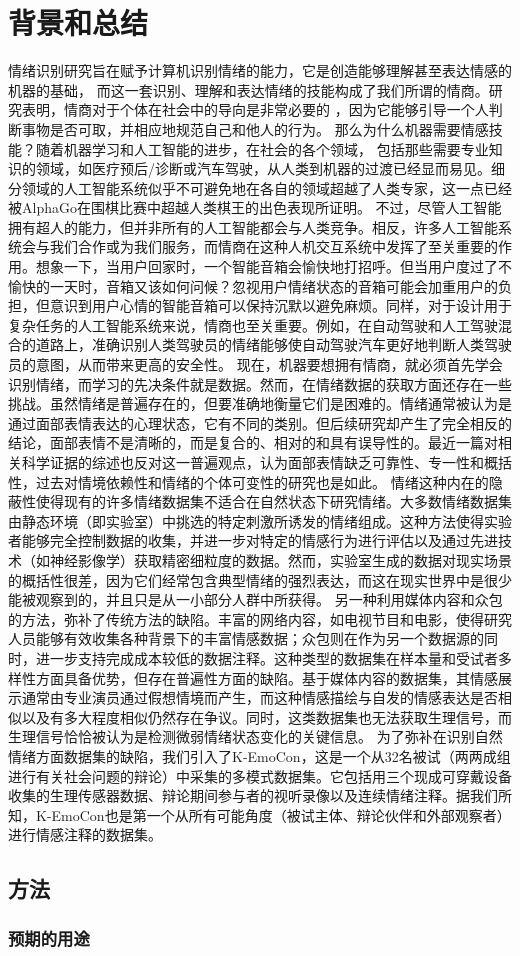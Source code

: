 \section{背景和总结}
情绪识别研究旨在赋予计算机识别情绪的能力，它是创造能够理解甚至表达情感的机器的基础，
而这一套识别、理解和表达情绪的技能构成了我们所谓的情商。研究表明，情商对于个体在社会中的导向是非常必要的
，因为它能够引导一个人判断事物是否可取，并相应地规范自己和他人的行为。
那么为什么机器需要情感技能？随着机器学习和人工智能的进步，在社会的各个领域，
包括那些需要专业知识的领域，如医疗预后/诊断或汽车驾驶，从人类到机器的过渡已经显而易见。细分领域的人工智能系统似乎不可避免地在各自的领域超越了人类专家，这一点已经被AlphaGo在围棋比赛中超越人类棋王的出色表现所证明。
不过，尽管人工智能拥有超人的能力，但并非所有的人工智能都会与人类竞争。相反，许多人工智能系统会与我们合作或为我们服务，而情商在这种人机交互系统中发挥了至关重要的作用。想象一下，当用户回家时，一个智能音箱会愉快地打招呼。但当用户度过了不愉快的一天时，音箱又该如何问候？忽视用户情绪状态的音箱可能会加重用户的负担，但意识到用户心情的智能音箱可以保持沉默以避免麻烦。同样，对于设计用于复杂任务的人工智能系统来说，情商也至关重要。例如，在自动驾驶和人工驾驶混合的道路上，准确识别人类驾驶员的情绪能够使自动驾驶汽车更好地判断人类驾驶员的意图，从而带来更高的安全性。
现在，机器要想拥有情商，就必须首先学会识别情绪，而学习的先决条件就是数据。然而，在情绪数据的获取方面还存在一些挑战。虽然情绪是普遍存在的，但要准确地衡量它们是困难的。情绪通常被认为是通过面部表情表达的心理状态，它有不同的类别。但后续研究却产生了完全相反的结论，面部表情不是清晰的，而是复合的、相对的和具有误导性的。最近一篇对相关科学证据的综述也反对这一普遍观点，认为面部表情缺乏可靠性、专一性和概括性，过去对情境依赖性和情绪的个体可变性的研究也是如此。
情绪这种内在的隐蔽性使得现有的许多情绪数据集不适合在自然状态下研究情绪。大多数情绪数据集由静态环境（即实验室）中挑选的特定刺激所诱发的情绪组成。这种方法使得实验者能够完全控制数据的收集，并进一步对特定的情感行为进行评估以及通过先进技术（如神经影像学）获取精密细粒度的数据。然而，实验室生成的数据对现实场景的概括性很差，因为它们经常包含典型情绪的强烈表达，而这在现实世界中是很少能被观察到的，并且只是从一小部分人群中所获得。
另一种利用媒体内容和众包的方法，弥补了传统方法的缺陷。丰富的网络内容，如电视节目和电影，使得研究人员能够有效收集各种背景下的丰富情感数据；众包则在作为另一个数据源的同时，进一步支持完成成本较低的数据注释。这种类型的数据集在样本量和受试者多样性方面具备优势，但存在普遍性方面的缺陷。基于媒体内容的数据集，其情感展示通常由专业演员通过假想情境而产生，而这种情感描绘与自发的情感表达是否相似以及有多大程度相似仍然存在争议。同时，这类数据集也无法获取生理信号，而生理信号恰恰被认为是检测微弱情绪状态变化的关键信息。
为了弥补在识别自然情绪方面数据集的缺陷，我们引入了K-EmoCon，这是一个从32名被试（两两成组进行有关社会问题的辩论）中采集的多模式数据集。它包括用三个现成可穿戴设备收集的生理传感器数据、辩论期间参与者的视听录像以及连续情绪注释。据我们所知，K-EmoCon也是第一个从所有可能角度（被试主体、辩论伙伴和外部观察者）进行情感注释的数据集。

\subsection{方法}
\subsubsection{预期的用途}
